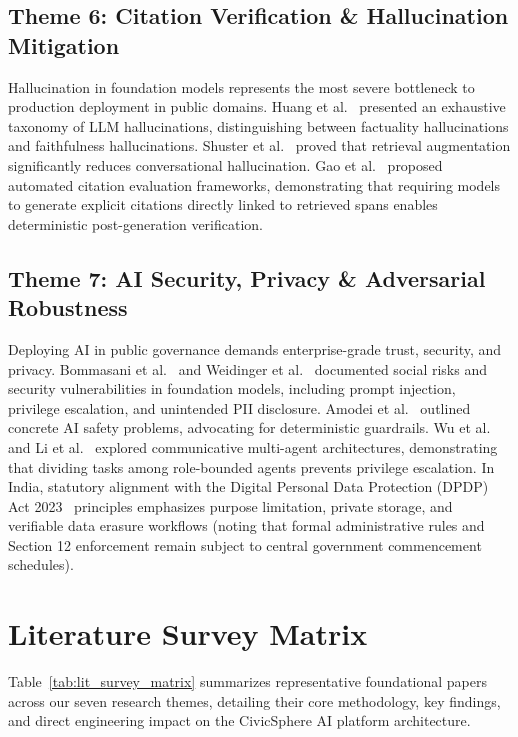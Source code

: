 \subsection{Theme 6: Citation Verification \& Hallucination Mitigation}
Hallucination in foundation models represents the most severe bottleneck to production deployment in public domains. Huang et al.~\cite{huang2023survey} presented an exhaustive taxonomy of LLM hallucinations, distinguishing between factuality hallucinations and faithfulness hallucinations. Shuster et al.~\cite{shuster2021retrieval} proved that retrieval augmentation significantly reduces conversational hallucination. Gao et al.~\cite{gao2023enabling} proposed automated citation evaluation frameworks, demonstrating that requiring models to generate explicit citations directly linked to retrieved spans enables deterministic post-generation verification.

\subsection{Theme 7: AI Security, Privacy \& Adversarial Robustness}
Deploying AI in public governance demands enterprise-grade trust, security, and privacy. Bommasani et al.~\cite{bommasani2021opportunities} and Weidinger et al.~\cite{weidinger2021ethical} documented social risks and security vulnerabilities in foundation models, including prompt injection, privilege escalation, and unintended PII disclosure. Amodei et al.~\cite{amodei2016concrete} outlined concrete AI safety problems, advocating for deterministic guardrails. Wu et al.~\cite{wu2023autogen} and Li et al.~\cite{li2023camel} explored communicative multi-agent architectures, demonstrating that dividing tasks among role-bounded agents prevents privilege escalation. In India, statutory alignment with the Digital Personal Data Protection (DPDP) Act 2023~\cite{dpdpact2023} principles emphasizes purpose limitation, private storage, and verifiable data erasure workflows (noting that formal administrative rules and Section 12 enforcement remain subject to central government commencement schedules).

\section{Literature Survey Matrix}
\label{sec:lit_matrix}
Table~\ref{tab:lit_survey_matrix} summarizes representative foundational papers across our seven research themes, detailing their core methodology, key findings, and direct engineering impact on the CivicSphere AI platform architecture.

